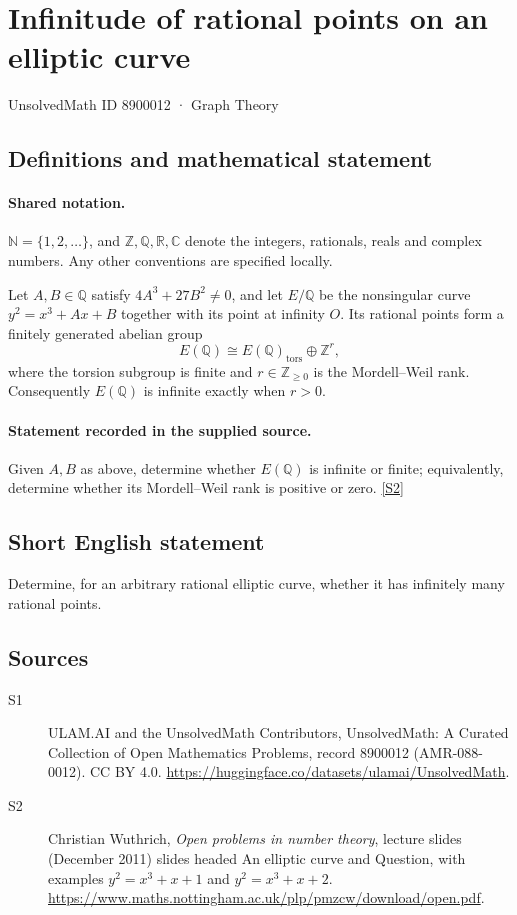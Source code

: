 \documentclass[11pt]{article}
\newcommand{\sref}[2]{\hyperlink{source:#1:#2}{[S#2]}}
\begin{document}
\setcounter{section}{8900011}
\section{Infinitude of rational points on an elliptic curve}\label{8900012}
{\small\sffamily UnsolvedMath ID 8900012 · Graph Theory}
\subsection{Definitions and mathematical statement}

\paragraph{Shared notation.}$\mathbb N=\{1,2,\ldots\}$, and $\mathbb Z,\mathbb Q,\mathbb R,\mathbb C$ denote the integers, rationals, reals and complex numbers. Any other conventions are specified locally.


Let $A,B\in\mathbb Q$ satisfy $4A^3+27B^2\ne0$, and let $E/\mathbb Q$ be the nonsingular curve $y^2=x^3+Ax+B$ together with its point at infinity $O$. Its rational points form a finitely generated abelian group
\[
E(\mathbb Q)\cong E(\mathbb Q)_{\mathrm{tors}}\oplus\mathbb Z^r,
\]
where the torsion subgroup is finite and $r\in\mathbb Z_{\ge0}$ is the Mordell--Weil rank. Consequently $E(\mathbb Q)$ is infinite exactly when $r>0$.
\paragraph{Statement recorded in the supplied source.}
Given $A,B$ as above, determine whether $E(\mathbb Q)$ is infinite or finite; equivalently, determine whether its Mordell--Weil rank is positive or zero. \sref{8900012}{2}
\subsection{Short English statement}
Determine, for an arbitrary rational elliptic curve, whether it has infinitely many rational points.
\subsection{Sources}
\begin{description}
\item[\hypertarget{source:8900012:1}{S1}] ULAM.AI and the UnsolvedMath Contributors, UnsolvedMath: A Curated Collection of Open Mathematics Problems, record 8900012 (AMR-088-0012). CC BY 4.0. \url{https://huggingface.co/datasets/ulamai/UnsolvedMath}.
\item[\hypertarget{source:8900012:2}{S2}] Christian Wuthrich, \emph{Open problems in number theory}, lecture slides (December 2011) slides headed An elliptic curve and Question, with examples $y^2=x^3+x+1$ and $y^2=x^3+x+2$. \url{https://www.maths.nottingham.ac.uk/plp/pmzcw/download/open.pdf}.
\end{description}
\label{end:8900012}
\end{document}
